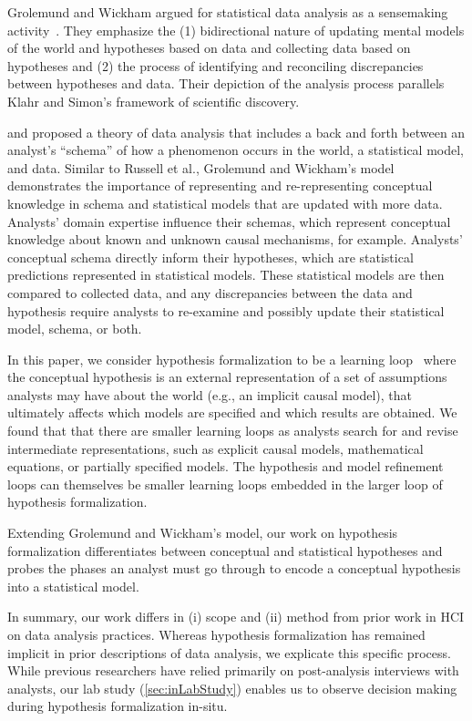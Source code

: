 Grolemund and Wickham argued for statistical data analysis as a sensemaking
activity~\cite{grolemund2014cognitive}. They emphasize the (1)
bidirectional nature of updating mental models of the world and hypotheses based
on data and collecting data based on hypotheses and (2) the process of
identifying and reconciling discrepancies between hypotheses and data. Their
depiction of the analysis process parallels Klahr and Simon's framework of
scientific discovery.

and proposed a theory of data
analysis that includes a back and forth between an analyst's ``schema'' of how a
phenomenon occurs in the world, a statistical model, and data. Similar to
Russell et al., Grolemund and Wickham's model demonstrates the importance of
representing and re-representing conceptual knowledge in schema and statistical
models that are updated with more data. Analysts' domain expertise influence
their schemas, which represent conceptual knowledge about known and unknown
causal mechanisms, for example. Analysts' conceptual schema directly inform
their hypotheses, which are statistical predictions represented in statistical
models. These statistical models are then compared to collected data, and any
discrepancies between the data and hypothesis require analysts to re-examine and
possibly update their statistical model, schema, or both. 

In this paper, we consider hypothesis formalization to be a learning loop~\cite{russell1993cost} where
the conceptual hypothesis is an external representation of a set of assumptions
analysts may have about the world (e.g., an implicit causal model), that ultimately
affects which models are specified and which results are
obtained. We found that that there are smaller learning loops as analysts search
for and revise intermediate representations, such as explicit causal models,
mathematical equations, or partially specified models. The
hypothesis and model refinement loops can themselves be smaller learning loops
embedded in the larger loop of hypothesis formalization. 

Extending Grolemund and Wickham's model, our work on
 hypothesis formalization differentiates between conceptual and statistical
 hypotheses and probes the phases an analyst must go through to encode a
 conceptual hypothesis into a statistical model.

In summary, our work differs in (i) scope and (ii) method from prior work in HCI
on data analysis practices. Whereas hypothesis formalization has remained
implicit in prior descriptions of data analysis, we explicate
this specific process. While previous researchers have relied primarily on
post-analysis interviews with analysts, our lab study (\autoref{sec:inLabStudy}) enables us to observe
decision making during hypothesis formalization in-situ.
